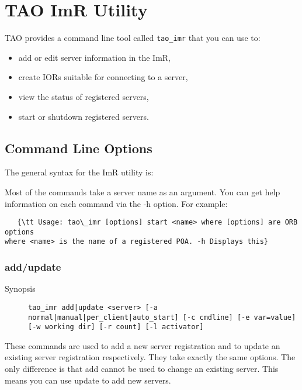 \section{TAO ImR Utility}
\label{taoimrutil}

TAO provides a command line tool called {\tt tao_imr} that you can use to:

\begin{itemize}
    \item add or edit server information in the ImR,
    \item create IORs suitable for connecting to a server,
    \item view the status of registered servers,
    \item start or shutdown registered servers.
\end{itemize}

\subsection{Command Line Options}

The general syntax for the ImR utility is:


Most of the commands take a server name as an argument. You can get help
information on each command via the -h option. For example:


\begin{verbatim}
   {\tt Usage: tao\_imr [options] start <name> where [options] are ORB options
where <name> is the name of a registered POA. -h Displays this}
\end{verbatim}

\subsubsection{add/update}

\begin{description}
    \item [Synopsis] {\tt tao\_imr add|update <server>
                 [-a normal|manual|per_client|auto_start] [-c cmdline]
                 [-e var=value] [-w working dir] [-r count] [-l activator]}
\end{description}

These commands are used to add a new server registration and to update
an existing server registration respectively. They take exactly the same
options. The only difference is that add cannot be used to change an
existing server. This means you can use update to add new servers.

